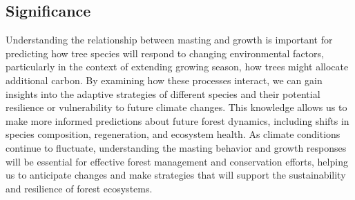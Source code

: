 \documentclass[11pt,letter]{article}
\begin{document}
\subsection{Significance}
Understanding the relationship between masting and growth is important for predicting how tree species will respond to changing environmental factors, particularly in the context of extending growing season, how trees might allocate additional carbon. By examining how these processes interact, we can gain insights into the adaptive strategies of different species and their potential resilience or vulnerability to future climate changes. This knowledge allows us to make more informed predictions about future forest dynamics, including shifts in species composition, regeneration, and ecosystem health. As climate conditions continue to fluctuate, understanding the  masting behavior and growth responses will be essential for effective forest management and conservation efforts, helping us to anticipate changes and make strategies that will support the sustainability and resilience of forest ecosystems.\par
\end{document}
